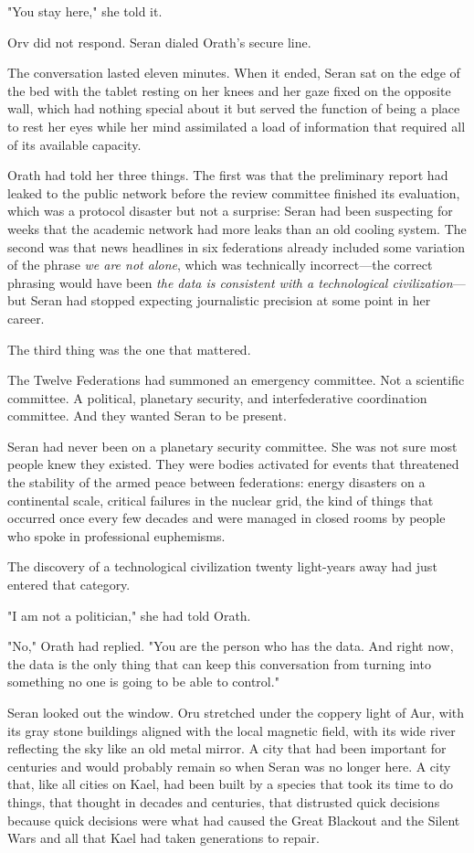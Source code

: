 \documentclass[11pt,a5paper,twoside]{book}
\begin{document}
"You stay here," she told it.

Orv did not respond. Seran dialed Orath's secure line.

The conversation lasted eleven minutes. When it ended, Seran sat on the edge of the bed with the tablet resting on her knees and her gaze fixed on the opposite wall, which had nothing special about it but served the function of being a place to rest her eyes while her mind assimilated a load of information that required all of its available capacity.

Orath had told her three things. The first was that the preliminary report had leaked to the public network before the review committee finished its evaluation, which was a protocol disaster but not a surprise: Seran had been suspecting for weeks that the academic network had more leaks than an old cooling system. The second was that news headlines in six federations already included some variation of the phrase \textit{we are not alone}, which was technically incorrect—the correct phrasing would have been \textit{the data is consistent with a technological civilization}—but Seran had stopped expecting journalistic precision at some point in her career.

The third thing was the one that mattered.

The Twelve Federations had summoned an emergency committee. Not a scientific committee. A political, planetary security, and interfederative coordination committee. And they wanted Seran to be present.

Seran had never been on a planetary security committee. She was not sure most people knew they existed. They were bodies activated for events that threatened the stability of the armed peace between federations: energy disasters on a continental scale, critical failures in the nuclear grid, the kind of things that occurred once every few decades and were managed in closed rooms by people who spoke in professional euphemisms.

The discovery of a technological civilization twenty light-years away had just entered that category.

"I am not a politician," she had told Orath.

"No," Orath had replied. "You are the person who has the data. And right now, the data is the only thing that can keep this conversation from turning into something no one is going to be able to control."

Seran looked out the window. Oru stretched under the coppery light of Aur, with its gray stone buildings aligned with the local magnetic field, with its wide river reflecting the sky like an old metal mirror. A city that had been important for centuries and would probably remain so when Seran was no longer here. A city that, like all cities on Kael, had been built by a species that took its time to do things, that thought in decades and centuries, that distrusted quick decisions because quick decisions were what had caused the Great Blackout and the Silent Wars and all that Kael had taken generations to repair.
\end{document}
